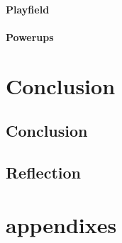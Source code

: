 \subsection{Playfield}
\subsection{Powerups}


\part{Conclusion}

\chapter{Conclusion}
\chapter{Reflection}



\part{appendixes}

% 
% 


